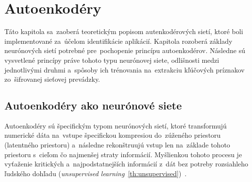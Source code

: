 \chapter{Autoenkodéry}
Táto kapitola sa~zaoberá teoretickým popisom autenkodérových sietí, ktoré boli implementované za~účelom identifikácie aplikácií. Kapitola rozoberá základy neurónových sietí potrebné pre~pochopenie princípu autoenkodérov. Následne sú vysvetlené princípy práve tohoto typu neurónovej siete, odlišnosti medzi jednotlivými druhmi a~spôsoby ich trénovania na~extrakciu kľúčových príznakov zo~šifrovanej sieťovej prevádzky.

\section{Autoenkodéry ako neurónové siete}
Autoenkodéry sú špecifickým typom neurónových sietí, ktoré transformujú numerické dáta na~vstupe špecifickou kompresiou do~zúženého priestoru (latentného priestoru) a~následne rekonštruujú vstup len na~základe tohoto priestoru s~cieľom čo najmenšej straty informácií. Myšlienkou tohoto procesu je vyťaženie kritických a~najpodstatnejších informácií z~dát bez potreby rozsiahleho ľudského dohľadu (\textit{unsupervised learning}~\ref{th:unsupervised})~\cite{mienye2025deep}.

